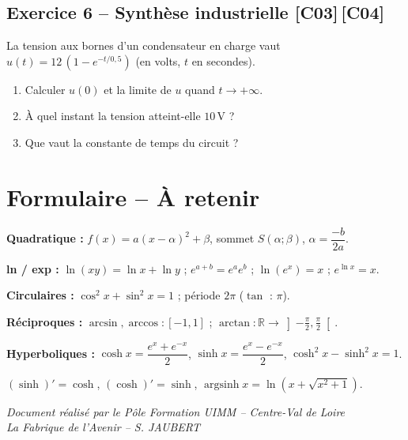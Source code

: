 \documentclass[a4paper,11pt]{article}
\begin{document}
\subsection*{Exercice 6 -- Synthèse industrielle \hfill {\normalsize\color{uimmred}[C03]\,[C04]}}
La tension aux bornes d'un condensateur en charge vaut $u(t) = 12\,(1 - e^{-t/0{,}5})$ (en volts, $t$ en secondes).
\begin{enumerate}[label=\alph*)]
  \item Calculer $u(0)$ et la limite de $u$ quand $t \to +\infty$.
  \item À quel instant la tension atteint-elle $10\,$V ?
  \item Que vaut la constante de temps du circuit ?
\end{enumerate}

\newpage
\section*{Formulaire -- À retenir}

\begin{tcolorbox}[colback=uimmlightblue, colframe=uimmblue, title={\textbf{Formulaire des fonctions classiques}}, fonttitle=\large\bfseries\sffamily, coltitle=white, boxrule=1.5pt, arc=5pt]

\textbf{Quadratique :} $f(x) = a(x-\alpha)^2 + \beta$, \; sommet $S(\alpha;\beta)$, \; $\alpha = \dfrac{-b}{2a}$.

\vspace{5pt}
\textbf{ln / exp :} $\ln(xy) = \ln x + \ln y$ ; \; $e^{a+b} = e^a e^b$ ; \; $\ln(e^x) = x$ ; \; $e^{\ln x} = x$.

\vspace{5pt}
\textbf{Circulaires :} $\cos^2 x + \sin^2 x = 1$ ; \; période $2\pi$ ($\tan$ : $\pi$).

\vspace{5pt}
\textbf{Réciproques :} $\arcsin, \arccos : [-1,1]$ ; \; $\arctan : \mathbb{R} \to \left]-\tfrac{\pi}{2}, \tfrac{\pi}{2}\right[$.

\vspace{5pt}
\textbf{Hyperboliques :} $\cosh x = \dfrac{e^x + e^{-x}}{2}$, \; $\sinh x = \dfrac{e^x - e^{-x}}{2}$, \; $\cosh^2 x - \sinh^2 x = 1$.

\vspace{5pt}
$(\sinh)' = \cosh$, \; $(\cosh)' = \sinh$, \; $\operatorname{argsinh} x = \ln\!\left(x + \sqrt{x^2+1}\right)$.
\end{tcolorbox}

\vfill
\begin{center}
\color{uimmgray}\small
\textit{Document réalisé par le Pôle Formation UIMM -- Centre-Val de Loire}\\
\textit{La Fabrique de l'Avenir -- S. JAUBERT}
\end{center}
\end{document}
